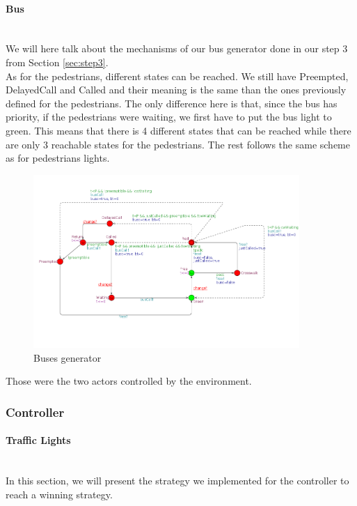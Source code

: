 \paragraph{Bus} \mbox{}\\
We will here talk about the mechanisms of our bus generator done in our step 3 from Section \ref{sec:step3}. \\
As for the pedestrians, different states can be reached. We still have Preempted, DelayedCall and Called and their meaning is the same than the ones previously defined for the pedestrians. The only difference here is that, since the bus has priority, if the pedestrians were waiting, we first have to put the bus light to green. This means that there is 4 different states that can be reached while there are only 3 reachable states for the pedestrians. The rest follows the same scheme as for pedestrians lights.

\begin{figure}[H]\label{fig:bus}
  \centering
    \includegraphics[width=0.9\textwidth]{picture/bus.png}
    \caption{Buses generator}
\end{figure}

\noindent Those were the two actors controlled by the environment.

\subsubsection{Controller}
\paragraph{Traffic Lights} \mbox{}\\

In this section, we will present the strategy we implemented for the controller to reach a winning strategy. \\

